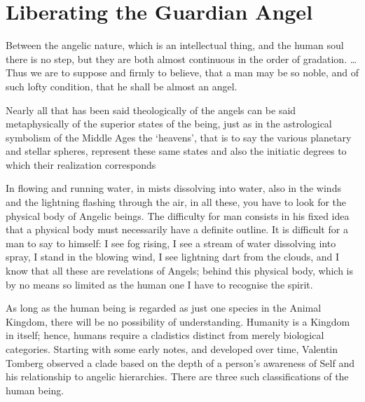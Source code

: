 \section{Liberating the Guardian Angel}

\begin{quotationx}
Between the angelic nature, which is an intellectual thing, and the human soul there is no step, but they are both
almost continuous in the order of gradation. … Thus we are to suppose and ﬁrmly to believe, that a man may be so noble,
and of such lofty condition, that he shall be almost an angel. 

Nearly all that has been said theologically of the angels can be said metaphysically of the superior states of the
being, just as in the astrological symbolism of the Middle Ages the ‘heavens’, that is to say
the various planetary and stellar spheres, represent these same states and also the initiatic degrees to which their
realization corresponds 

In flowing and running water, in mists dissolving into water, also in the winds and the lightning flashing through the
air, in all these, you have to look for the physical body of Angelic beings. The difficulty for man consists in his
fixed idea that a physical body must necessarily have a definite outline. It is difficult for a man to say to himself:
I see fog rising, I see a stream of water dissolving into spray, I stand in the blowing wind, I see lightning dart from
the clouds, and I know that all these are revelations of Angels; behind this physical body, which is by no means so
limited as the human one I have to recognise the spirit. 
\end{quotationx}

As long as the human being is regarded as just one species in the Animal Kingdom, there will be no possibility of
understanding. Humanity is a Kingdom in itself; hence, humans require a cladistics distinct from merely biological
categories. Starting with some early notes, and developed over time, Valentin Tomberg observed a clade based on the
depth of a person's awareness of Self and his relationship to angelic hierarchies. There are three such
classifications of the human being.

